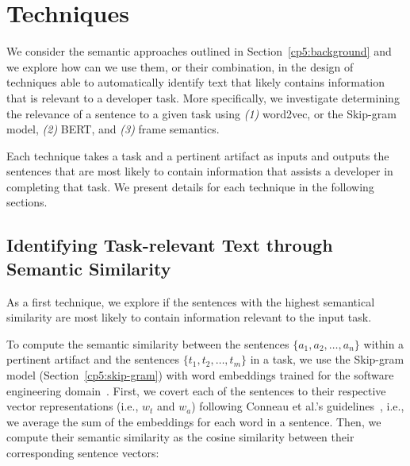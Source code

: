 \clearpage

\section{Techniques}
\label{cp5:approaches}





We consider the semantic approaches outlined in Section~\ref{cp5:background} and we explore 
how can we use them, or their combination, in the design of techniques able to automatically identify text that likely contains information that is relevant to a developer task. 
More specifically, we investigate determining the relevance of a sentence to a given task using 
\textit{(1)} word2vec, or the Skip-gram model, \textit{(2)} BERT, and \textit{(3)} frame semantics.

    




Each technique takes a task and a pertinent artifact as inputs and outputs the sentences that are most likely to contain information that assists a developer in completing that task.
We present details for each technique in the following sections.




\subsection{Identifying Task-relevant Text through Semantic Similarity}
\label{cp5:approach-w2v}


As a first technique, we explore if the sentences with the highest semantical similarity are most likely to contain information relevant to the input task. 


To compute the semantic similarity between the sentences $\{a_1, a_2, \dots, a_n\}$ within a pertinent artifact and the sentences $\{t_1, t_2, \dots, t_m\}$ in a task, 
we use the Skip-gram model (Section~\ref{cp5:skip-gram}) with word embeddings trained for the software engineering domain~\cite{Efstathiou2018}. 
First, we covert each of the sentences to their respective vector representations (i.e., $w_t$ and $w_a$) following Conneau et al.'s guidelines~\cite{conneau2018}, i.e., we average the sum of the embeddings for each word in a sentence.
Then, we compute their semantic similarity as the cosine similarity  between their corresponding sentence vectors:


